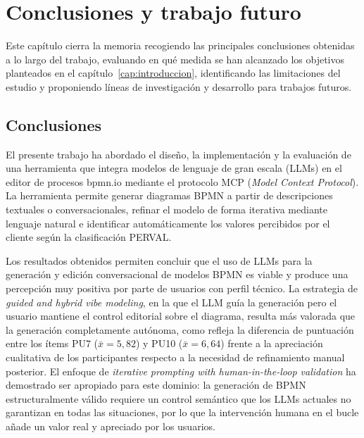 

\chapter{Conclusiones y trabajo futuro}\label{cap:conclusiones}

Este capítulo cierra la memoria recogiendo las principales conclusiones obtenidas a lo largo del trabajo, evaluando en qué medida se han alcanzado los objetivos planteados en el capítulo~\ref{cap:introduccion}, identificando las limitaciones del estudio y proponiendo líneas de investigación y desarrollo para trabajos futuros.

\section{Conclusiones}\label{sec:conclusiones}

El presente trabajo ha abordado el diseño, la implementación y la evaluación de una herramienta que integra modelos de lenguaje de gran escala (LLMs) en el editor de procesos bpmn.io mediante el protocolo MCP (\textit{Model Context Protocol}). La herramienta permite generar diagramas BPMN a partir de descripciones textuales o conversacionales, refinar el modelo de forma iterativa mediante lenguaje natural e identificar automáticamente los valores percibidos por el cliente según la clasificación PERVAL.

Los resultados obtenidos permiten concluir que el uso de LLMs para la generación y edición conversacional de modelos BPMN es viable y produce una percepción muy positiva por parte de usuarios con perfil técnico. La estrategia de \textit{guided and hybrid vibe modeling}, en la que el LLM guía la generación pero el usuario mantiene el control editorial sobre el diagrama, resulta más valorada que la generación completamente autónoma, como refleja la diferencia de puntuación entre los ítems PU7 ($\bar{x} = 5{,}82$) y PU10 ($\bar{x} = 6{,}64$) frente a la apreciación cualitativa de los participantes respecto a la necesidad de refinamiento manual posterior. El enfoque de \textit{iterative prompting with human-in-the-loop validation} ha demostrado ser apropiado para este dominio: la generación de  BPMN estructuralmente válido requiere un control semántico que los LLMs actuales no garantizan en todas las situaciones, por lo que la intervención humana en el bucle añade un valor real y apreciado por los usuarios.

